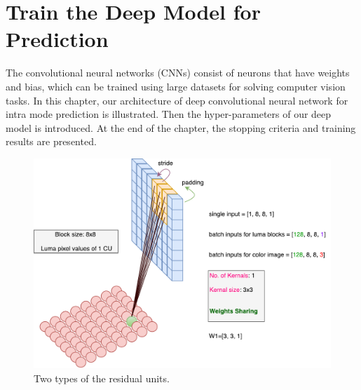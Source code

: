\chapter{Train the Deep Model for Prediction}\label{ch:chapter4} %
%
The convolutional neural networks (CNNs) consist of neurons that have 
weights and bias, which can be trained using large datasets for solving 
computer vision tasks.
In this chapter, our architecture of
deep convolutional neural network for intra mode prediction 
is illustrated.
Then the hyper-parameters of our deep model is introduced.
At the end of the chapter, the stopping criteria and training results 
are presented.
\begin{figure}
    \centering
    \includegraphics[width=\textwidth,height=\textheight,keepaspectratio]{Figures/cnn_illustration.pdf}
    \caption[Two types of the residual units]{
        Two types of the residual units.}\label{fig:cnn-illustration}
\end{figure}

